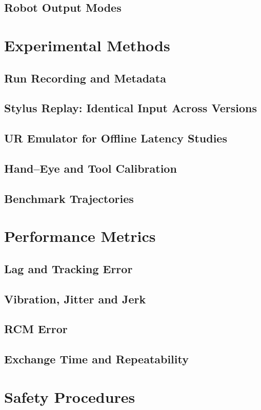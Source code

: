 \subsection{Robot Output Modes}
\label{sec:methods-output-modes}

\section{Experimental Methods}
\label{sec:methods-experiments}

\subsection{Run Recording and Metadata}
\label{sec:methods-recording}

\subsection{Stylus Replay: Identical Input Across Versions}
\label{sec:methods-replay}

\subsection{UR Emulator for Offline Latency Studies}
\label{sec:methods-emulator}

\subsection{Hand--Eye and Tool Calibration}
\label{sec:methods-calibration}

\subsection{Benchmark Trajectories}
\label{sec:methods-benchmarks}

\section{Performance Metrics}
\label{sec:methods-metrics}

\subsection{Lag and Tracking Error}
\label{sec:methods-lag}

\subsection{Vibration, Jitter and Jerk}
\label{sec:methods-vibration}

\subsection{RCM Error}
\label{sec:methods-rcm-error}

\subsection{Exchange Time and Repeatability}
\label{sec:methods-exchange-metrics}

\section{Safety Procedures}
\label{sec:methods-safety}
